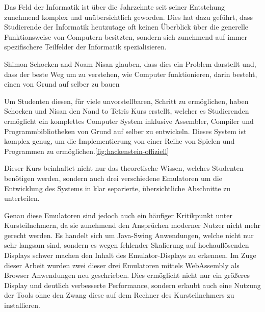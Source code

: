 Das Feld der Informatik ist über die Jahrzehnte seit seiner Entstehung zunehmend
komplex und unübersichtlich geworden.
Dies hat dazu geführt, dass Studierende der Informatik heutzutage oft keinen Überblick über die generelle Funktionsweise von Computern besitzten, sondern sich zunehmend auf immer spezifischere Teilfelder der Informatik spezialisieren.

Shimon Schocken and Noam Nisan glauben, dass dies ein Problem darstellt und, dass der beste Weg um zu verstehen, wie Computer funktionieren, darin besteht, einen von Grund auf selber zu bauen~\cite[Preface]{nisan2005}

Um Studenten diesen, für viele unvorstellbaren, Schritt zu ermöglichen, haben Schocken und Nisan den Nand to Tetris Kurs erstellt, welcher es Studierenden ermöglicht ein komplettes Computer System inklusive Assembler, Compiler und Programmbibliotheken von Grund auf selber zu entwickeln. Dieses System ist komplex genug, um die Implementierung von einer Reihe von Spielen und Programmen zu ermöglichen.\ref{fig:hackenstein-offiziell}

Dieser Kurs beinhaltet nicht nur das theoretische Wissen, welches Studenten benötigen werden, sondern auch drei verschiedene Emulatoren um die Entwicklung des Systems in klar separierte, übersichtliche Abschnitte zu unterteilen.

Genau diese Emulatoren sind jedoch auch ein häufiger Kritikpunkt unter Kursteilnehmern, da sie zunehmend den Ansprüchen moderner Nutzer nicht mehr gerecht werden. Es handelt sich um Java-Swing Anwendungen, welche nicht nur sehr langsam sind, sondern es wegen fehlender Skalierung auf hochauflösenden Displays schwer machen den Inhalt des Emulator-Displays zu erkennen.
Im Zuge dieser Arbeit wurden zwei dieser drei Emulatoren mittels WebAssembly als Browser Anwendungen neu geschrieben. Dies ermöglicht nicht nur ein größeres Display und deutlich verbesserte Performance, sondern erlaubt auch eine Nutzung der Tools ohne den Zwang diese auf dem Rechner des Kursteilnehmers zu installieren.
